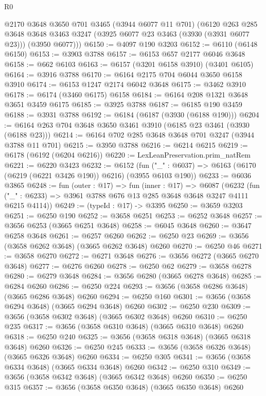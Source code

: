 \begin{lexlean}{R0}
\begin{coremodule}
      @2170
      @3648
      @3650
      @701
      @3465
      (@3944 @6077 @11 @701)
      (@6120
        @263
        @285
        @3648
        @3648
        @3463
        @3247
        (@3925 @6077 @23 @3463 (@3930 (@3931 @6077 @23)))
        (@3950 @6077)))
@6150 := @4097 @190 @3203
@6152 := @6110 (@6148 @6150)
@6153 := @3903 @3788
@6157 := @6153 @657 @2177 @6046 @3648
@6158 := @662 @6103
@6163 := @6157 (@3201 @6158 @3910) (@3401 @6105)
@6164 := @3916 @3788
@6170 := @6164 @2175 @704 @6044 @3650 @6158 @3910
@6174 := @6153 @1247 @2174 @6042 @3648
@6175 := @3462 @3910
@6178 := @6174 (@3460 @6175) @6158
@6184 := @6164 @208 @1321 @3648 @3651 @3459 @6175
@6185 := @3925 @3788
@6187 := @6185 @190 @3459
@6188 := @3931 @3788
@6192 := @6184 (@6187 (@3930 (@6188 @190)))
@6204 := @6164 @263 @704 @3648 @3650 @3461 @3910 (@6185 @23 @3461 (@3930 (@6188 @23)))
@6214 := @6164 @702 @285 @3648 @3648 @701 @3247 (@3944 @3788 @11 @701)
@6215 := @3950 @3788
@6216 := @6214 @6215
@6219 := @6178 (@6192 (@6204 @6216))
@6220 := LexLeanPreservation.prim_natRem
@6221 := @6220 @3423
@6232 := @6152
    (fun ("_" : @6037) => @6163 (@6170 (@6219 (@6221 @3426 @190)) @6216) (@3955 @6103 @190))
@6233 := @6036 @3865
@6248 := fun (outer : @17) =>
  fun (inner : @17) =>
  @6087 (@6232 (fun ("_" : @6233) => @3961 @3788 @676 @13 @285 @3648 @3648 @3247 @4111 @6215 @4114))
@6249 := (typeId : @17) -> @3395
@6250 := @3659 @3203
@6251 := @6250 @190
@6252 := @3658 @6251
@6253 := @6252 @3648
@6257 := @3656 @6253 (@3665 @6251 @3648)
@6258 := @6045 @3648
@6260 := @3647 @6258 @3648
@6261 := @6257 @6260
@6262 := @6250 @23
@6269 := @3656 (@3658 @6262 @3648) (@3665 @6262 @3648) @6260
@6270 := @6250 @46
@6271 := @3658 @6270
@6272 := @6271 @3648
@6276 := @3656 @6272 (@3665 @6270 @3648)
@6277 := @6276 @6260
@6278 := @6250 @62
@6279 := @3658 @6278
@6280 := @6279 @3648
@6284 := @3656 @6280 (@3665 @6278 @3648)
@6285 := @6284 @6260
@6286 := @6250 @224
@6293 := @3656 (@3658 @6286 @3648) (@3665 @6286 @3648) @6260
@6294 := @6250 @160
@6301 := @3656 (@3658 @6294 @3648) (@3665 @6294 @3648) @6260
@6302 := @6250 @230
@6309 := @3656 (@3658 @6302 @3648) (@3665 @6302 @3648) @6260
@6310 := @6250 @235
@6317 := @3656 (@3658 @6310 @3648) (@3665 @6310 @3648) @6260
@6318 := @6250 @240
@6325 := @3656 (@3658 @6318 @3648) (@3665 @6318 @3648) @6260
@6326 := @6250 @245
@6333 := @3656 (@3658 @6326 @3648) (@3665 @6326 @3648) @6260
@6334 := @6250 @305
@6341 := @3656 (@3658 @6334 @3648) (@3665 @6334 @3648) @6260
@6342 := @6250 @310
@6349 := @3656 (@3658 @6342 @3648) (@3665 @6342 @3648) @6260
@6350 := @6250 @315
@6357 := @3656 (@3658 @6350 @3648) (@3665 @6350 @3648) @6260

\end{coremodule}
\end{lexlean}
